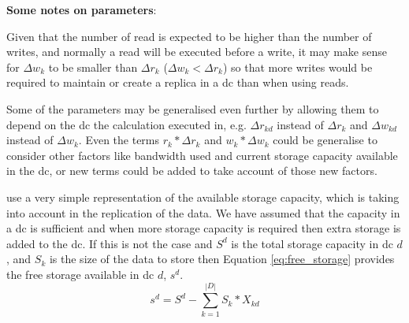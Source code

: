 \documentclass[english]{article}
\begin{document}
{\bf Some notes on parameters}: 

Given that the number of read is expected to be higher than the number of writes, and normally a read will be executed before a write, it may make sense for $\Delta w_{k}$ to be smaller than $\Delta r_{k}$ ($\Delta w_{k} < \Delta r_{k}$) so that more writes would be required to maintain or create a replica in a \gls{dc} than when using reads.

Some of the parameters may be generalised even further by allowing them to depend on the \gls{dc} the calculation executed in, e.g. $\Delta r_{kd}$ instead of $\Delta r_{k}$ and $\Delta w_{kd}$ instead of $\Delta w_{k}$. Even the terms $r_{k} * \Delta r_{k}$ and $w_{k} * \Delta w_{k}$ could be generalise to consider other factors like bandwidth used and current storage capacity available in the \gls{dc}, or new terms could be added to take account of those new factors.

\citet{Paiva2013a} use a very simple representation of the available storage capacity, which is taking into account in the replication of the data. We have assumed that the capacity in a \gls{dc} is sufficient and when more storage capacity is required then extra storage is added to the \gls{dc}. If this is not the case and $S^{d}$ is the total storage capacity in \gls{dc} $d$, and $S_{k}$ is the size of the data to store then Equation \ref{eq:free_storage} provides the free storage available in \gls{dc} $d$, $s^{d}$.
\begin{equation} \label{eq:free_storage}
	s^{d} = S^{d} - \sum^{|D|}_{k = 1} S_{k} * X_{kd}
\end{equation}
\end{document}
